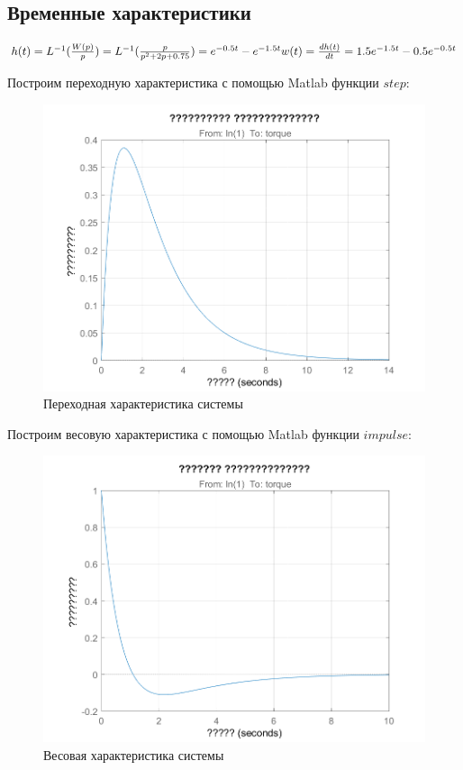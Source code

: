 \documentclass[14pt,a4paper,report]{report}
\begin{document}
\subsection{Временные характеристики}

$
\\
h(t)=L^{-1}(\frac{W(p)}{p})=L^{-1}(\frac{p}{p^2+2p+0.75})= e^{-0.5t} - e^{-1.5t}\\
w(t)=\frac{dh(t)}{dt}=1.5e^{-1.5t} - 0.5e^{-0.5t}\\
$

\newpage
Построим переходную характеристика с помощью Matlab функции $step$:

\begin{figure}[h!]
	\centering
	\includegraphics[scale = 0.7]{images/step.png}
	\caption{Переходная характеристика системы}
	\label{image:9}
\end{figure}

Построим весовую характеристика с помощью Matlab функции $impulse$:\newline
\newpage

\begin{figure}[h!]
	\centering
	\includegraphics[scale = 0.8]{images/impulse.png}
	\caption{Весовая характеристика системы}
	\label{image:9}
\end{figure}
\end{document}
